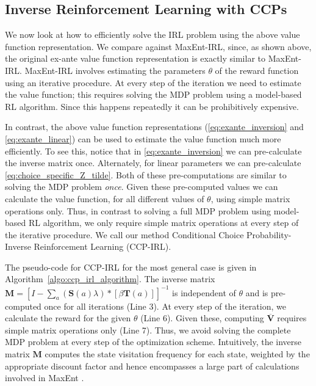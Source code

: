\documentclass{article}
\begin{document}
\subsection{Inverse Reinforcement Learning with CCPs}
We now look at how to efficiently solve the IRL problem using the above value function representation. 
We compare against MaxEnt-IRL, since, as shown above, the original ex-ante value function representation is exactly similar to MaxEnt-IRL.
MaxEnt-IRL involves estimating the parameters $\theta$ of the reward function using an iterative procedure.
At every step of the iteration we need to estimate the value function; this requires solving the MDP problem using a model-based RL algorithm. Since this happens repeatedly it can be prohibitively expensive.

In contrast, the above value function representations (\eqref{eq:exante_inversion} and \eqref{eq:exante_linear}) can be used to estimate the value function much more efficiently. To see this, notice that in \eqref{eq:exante_inversion} we can pre-calculate the inverse matrix once. Alternately, for linear parameters we can pre-calculate \eqref{eq:choice_specific_Z_tilde}. Both of these pre-computations are similar to solving the MDP problem \textit{once}. Given these pre-computed values we can calculate the value function, for all different values of $\theta$, using simple matrix operations only. Thus, in contrast to solving a full MDP problem using model-based RL algorithm, we only require simple matrix operations at every step of the iterative procedure. We call our method Conditional Choice Probability-Inverse Reinforcement Learning (CCP-IRL).

The pseudo-code for CCP-IRL for the most general case is given in Algorithm~\ref{algo:ccp_irl_algorithm}.
The inverse matrix $\mathbf{M}=\left[I-\sum_{a}(\mathbf{S}(a) \lambda) *\left[ \beta \mathbf{T}(a)  \right]\right]^{-1}$ is independent of $\theta$ and is pre-computed once for all iterations (Line 3).
At every step of the iteration, we calculate the reward for the given $\theta$ (Line 6). Given these, computing $\mathbf{\overline{V}}$ requires simple matrix operations only (Line 7). Thus, we avoid solving the complete MDP problem at every step of the optimization scheme.
Intuitively, the inverse matrix $\mathbf{M}$ computes the state visitation frequency for each state, weighted by the appropriate discount factor and hence encompasses a large part of calculations involved in MaxEnt \cite{ziebart_phd}.

\end{document}
